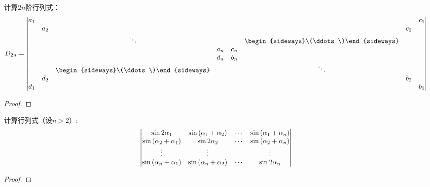 \begin{problem}
计算\(2n\)阶行列式：
\begin{equation*}
    D_{2n}=
    \begin{vmatrix}
        a_1 &     &                                          &     &     &                                          &     & c_1 \\
            & a_2 &                                          &     &     &                                          & c_2 &     \\
            &     & \ddots                                   &     &     & \begin{sideways}\(\ddots\)\end{sideways} &     &     \\
            &     &                                          & a_n & c_n &                                          &     &     \\
            &     &                                          & d_n & b_n &                                          &     &     \\
            &     & \begin{sideways}\(\ddots\)\end{sideways} &     &     & \ddots                                   &     &     \\
            & d_2 &                                          &     &     &                                          & b_2 &     \\
        d_1 &     &                                          &     &     &                                          &     & b_1
    \end{vmatrix}
\end{equation*}
\end{problem}
\begin{proof}
\end{proof}

\begin{problem}
计算行列式（设\(n>2\)）:
\begin{equation*}
    \begin{vmatrix}
        \sin 2\alpha_1                    & \sin\left( \alpha_{1}+\alpha_{2} \right) & \cdots & \sin\left( \alpha_{1}+\alpha_{n} \right) \\
        \sin\left( \alpha_{2}+\alpha_{1} \right) & \sin 2\alpha_2                    & \cdots & \sin\left( \alpha_{2}+\alpha_{n} \right) \\
        \vdots                            & \vdots                            &        & \vdots                            \\
        \sin\left( \alpha_{n}+\alpha_{1} \right) & \sin\left( \alpha_{n}+\alpha_{2} \right) & \cdots & \sin 2\alpha_n
    \end{vmatrix}
\end{equation*}
\end{problem}
\begin{proof}

\end{proof}

